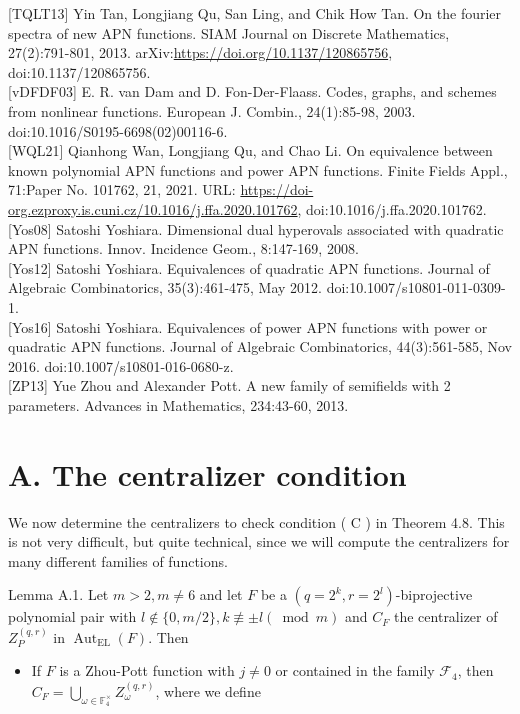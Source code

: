 \documentclass[10pt]{article}
\begin{document}
[TQLT13] Yin Tan, Longjiang Qu, San Ling, and Chik How Tan. On the fourier spectra of new APN functions. SIAM Journal on Discrete Mathematics, 27(2):791-801, 2013. arXiv:\href{https://doi.org/10.1137/120865756}{https://doi.org/10.1137/120865756}, doi:10.1137/120865756.\\[0pt]
[vDFDF03] E. R. van Dam and D. Fon-Der-Flaass. Codes, graphs, and schemes from nonlinear functions. European J. Combin., 24(1):85-98, 2003. doi:10.1016/S0195-6698(02)00116-6.\\[0pt]
[WQL21] Qianhong Wan, Longjiang Qu, and Chao Li. On equivalence between known polynomial APN functions and power APN functions. Finite Fields Appl., 71:Paper No. 101762, 21, 2021. URL: \href{https://doi-org.ezproxy.is.cuni.cz/10.1016/j.ffa.2020.101762}{https://doi-org.ezproxy.is.cuni.cz/10.1016/j.ffa.2020.101762}, doi:10.1016/j.ffa.2020.101762.\\[0pt]
[Yos08] Satoshi Yoshiara. Dimensional dual hyperovals associated with quadratic APN functions. Innov. Incidence Geom., 8:147-169, 2008.\\[0pt]
[Yos12] Satoshi Yoshiara. Equivalences of quadratic APN functions. Journal of Algebraic Combinatorics, 35(3):461-475, May 2012. doi:10.1007/s10801-011-0309-1.\\[0pt]
[Yos16] Satoshi Yoshiara. Equivalences of power APN functions with power or quadratic APN functions. Journal of Algebraic Combinatorics, 44(3):561-585, Nov 2016. doi:10.1007/s10801-016-0680-z.\\[0pt]
[ZP13] Yue Zhou and Alexander Pott. A new family of semifields with 2 parameters. Advances in Mathematics, 234:43-60, 2013.

\section*{A. The centralizer condition}
We now determine the centralizers to check condition ( C ) in Theorem 4.8. This is not very difficult, but quite technical, since we will compute the centralizers for many different families of functions.

Lemma A.1. Let $m>2, m \neq 6$ and let $F$ be a $\left(q=2^{k}, r=2^{l}\right)$-biprojective polynomial pair with $l \notin\{0, m / 2\}, k \not \equiv \pm l(\bmod m)$ and $C_{F}$ the centralizer of $Z_{P}^{(q, r)}$ in $\operatorname{Aut}_{\mathrm{EL}}(F)$. Then

\begin{itemize}
  \item If $F$ is a Zhou-Pott function with $j \neq 0$ or contained in the family $\mathcal{F}_{4}$, then $C_{F}= \bigcup_{\omega \in \mathbb{F}_{4}^{\times}} Z_{\omega}^{(q, r)}$, where we define
\end{itemize}
\end{document}
